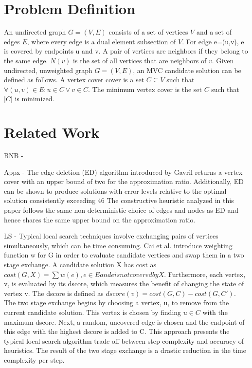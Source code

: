 \documentclass{sig-alternate-05-2015}
\begin{document}
\section{Problem Definition}
An undirected graph $G=(V,E)$ consists of a set of vertices $V$ and a set of edges $E$, where every edge is a dual element subsection of $V$. For edge e=(u,v), e is covered by endpoints u and v.  A pair of vertices are neighbors if they belong to the same edge. $N(v)$ is the set of all vertices that are neighbors of $v$.
	Given undirected, unweighted graph $G=(V,E)$, an MVC candidate solution can be defined as follows. A vertex cover cover is a set $C \subseteq V$ such that $\forall (u,v) \in E : u \in C \vee v \in C$. The minimum vertex cover is the set $C$ such that $|C|$ is minimized.

\section{Related Work}
BNB - 

Appx - The edge deletion (ED) algorithm introduced by Gavril returns a vertex cover with an upper bound of two for the approximation ratio.  Additionally, ED can be shown to produce solutions with error levels relative to the optimal solution consistently exceeding 46%
	The constructive heuristic analyzed in this paper follows the same non-deterministic choice of edges and nodes as ED and hence shares the same upper bound on the approximation ratio.

LS - Typical local search techniques involve exchanging pairs of vertices simultaneously, which can be time consuming.  Cai et al. introduce weighting function w for G in order to evaluate candidate vertices and swap them in a two stage exchange.  A candidate solution X has cost as $cost(G,X) = \sum w(e), e\in E and e is not covered by X$.  Furthermore, each vertex, v, is evaluated by its dscore, which measures the benefit of changing the state of vertex v.  The dscore is defined as $dscore(v) = cost(G,C)-cost(G,C')$.
	The two stage exchange begins by choosing a vertex, u, to remove from the current candidate solution.  This vertex is chosen by finding $u \in C$ with the maximum dscore.  Next, a random, uncovered edge is chosen and the endpoint of this edge with the highest dscore is added to C.  This approach presents the typical local search algorithm trade off between step complexity and accuracy of heuristics.  The result of the two stage exchange is a drastic reduction in the time complexity per step.
\end{document}
